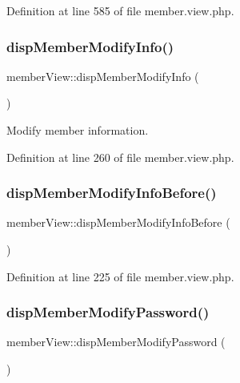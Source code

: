 Definition at line 585 of file member.\+view.\+php.

\mbox{\label{classmemberView_a8636a54e610e74b3d5fffa3611589d89}} 
\subsubsection{\texorpdfstring{disp\+Member\+Modify\+Info()}{dispMemberModifyInfo()}}
{\footnotesize\ttfamily member\+View\+::disp\+Member\+Modify\+Info (\begin{DoxyParamCaption}{ }\end{DoxyParamCaption})}



Modify member information. 



Definition at line 260 of file member.\+view.\+php.

\mbox{\label{classmemberView_a5cb3b51c7c44b99bd37734fc053a06e4}} 
\subsubsection{\texorpdfstring{disp\+Member\+Modify\+Info\+Before()}{dispMemberModifyInfoBefore()}}
{\footnotesize\ttfamily member\+View\+::disp\+Member\+Modify\+Info\+Before (\begin{DoxyParamCaption}{ }\end{DoxyParamCaption})}



Definition at line 225 of file member.\+view.\+php.

\mbox{\label{classmemberView_a1dd84088d30395acb35e87abfe0a6c53}} 
\subsubsection{\texorpdfstring{disp\+Member\+Modify\+Password()}{dispMemberModifyPassword()}}
{\footnotesize\ttfamily member\+View\+::disp\+Member\+Modify\+Password (\begin{DoxyParamCaption}{ }\end{DoxyParamCaption})}



